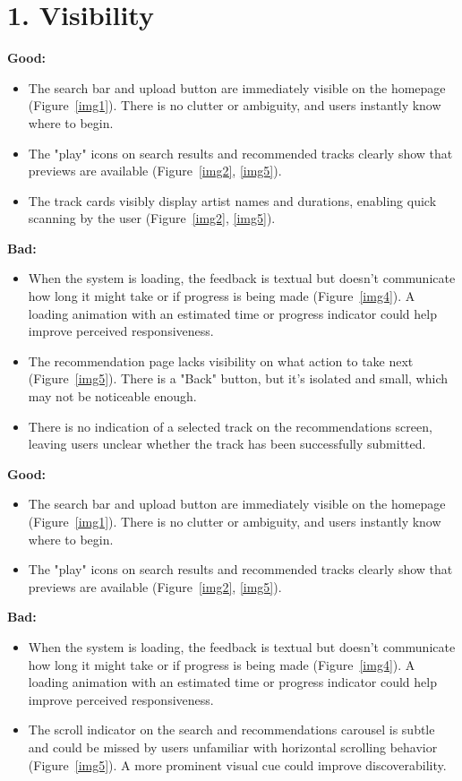 \documentclass[12pt]{article}
\begin{document}
\section*{1. Visibility}

\textbf{Good:}
\begin{itemize}
    \item The search bar and upload button are immediately visible on the homepage (Figure~\ref{img1}). There is no clutter or ambiguity, and users instantly know where to begin.
    \item The "play" icons on search results and recommended tracks clearly show that previews are available (Figure~\ref{img2}, \ref{img5}).
    \item The track cards visibly display artist names and durations, enabling quick scanning by the user (Figure~\ref{img2}, \ref{img5}).
\end{itemize}

\textbf{Bad:}
\begin{itemize}
    \item When the system is loading, the feedback is textual but doesn’t communicate how long it might take or if progress is being made (Figure~\ref{img4}). A loading animation with an estimated time or progress indicator could help improve perceived responsiveness.
    \item The recommendation page lacks visibility on what action to take next (Figure~\ref{img5}). There is a "Back" button, but it's isolated and small, which may not be noticeable enough.
    \item There is no indication of a selected track on the recommendations screen, leaving users unclear whether the track has been successfully submitted.
\end{itemize}


\textbf{Good:}
\begin{itemize}
    \item The search bar and upload button are immediately visible on the homepage (Figure~\ref{img1}). There is no clutter or ambiguity, and users instantly know where to begin.
    \item The "play" icons on search results and recommended tracks clearly show that previews are available (Figure~\ref{img2}, \ref{img5}).
\end{itemize}

\textbf{Bad:}
\begin{itemize}
    \item When the system is loading, the feedback is textual but doesn’t communicate how long it might take or if progress is being made (Figure~\ref{img4}). A loading animation with an estimated time or progress indicator could help improve perceived responsiveness.
    \item The scroll indicator on the search and recommendations carousel is subtle and could be missed by users unfamiliar with horizontal scrolling behavior (Figure~\ref{img5}). A more prominent visual cue could improve discoverability.
\end{itemize}
\end{document}
